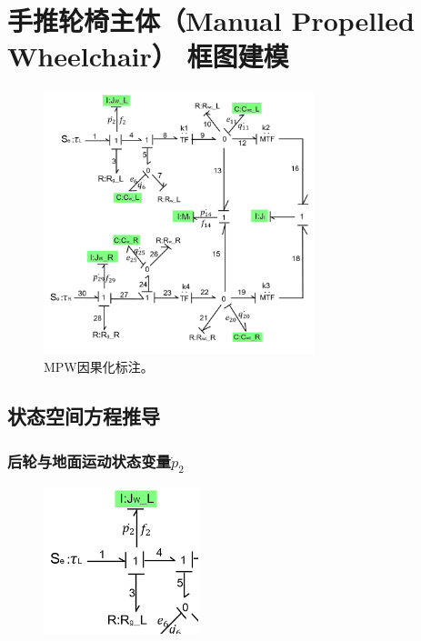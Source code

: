 \clearpage
\section{手推轮椅主体（Manual Propelled Wheelchair） 框图建模}

\begin{figure}[h]
	\centering
	\includegraphics[width=0.7\textwidth]{fig/MPW.png}
	\caption{MPW因果化标注。}\label{fig:mdm}
\end{figure}

\subsection{状态空间方程推导}
\subsubsection{后轮与地面运动状态变量$\dot{p}_2 $}

\begin{figure}[h]
	\centering
	\includegraphics[width=0.4\textwidth]{fig/2_equation1.png}
\end{figure}

